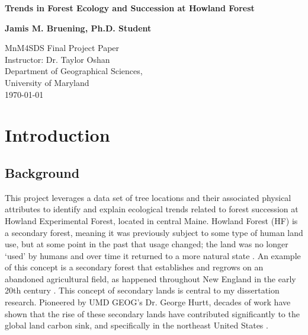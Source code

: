 \documentclass[12pt,a4paper]{article}
\begin{document}
\begin{titlepage}
\begin{center}
\vspace*{7cm}
\begin{LARGE}
\textbf{Trends in Forest Ecology and Succession at Howland Forest}
\end{LARGE}

\vspace{6.5cm}

\begin{Large}
\textbf{Jamis M. Bruening, Ph.D. Student}\\
\end{Large}

\vspace*{0.5cm}


MnM4SDS Final Project Paper \\
Instructor: Dr. Taylor Oshan \\
Department of Geographical Sciences, \\
University of Maryland \\
\vspace*{.5cm}
\today 


\vspace*{5cm}

\end{center}
\end{titlepage}
\newpage

\setcounter{tocdepth}{2}
\tableofcontents
\newpage

\doublespacing

\section{Introduction}

\subsection{Background}

This project leverages a data set of tree locations and their associated physical attributes to identify and explain ecological trends related to forest succession at Howland Experimental Forest, located in central Maine.  Howland Forest (HF) is a secondary forest, meaning it was previously subject to some type of human land use, but at some point in the past that usage changed; the land was no longer `used' by humans and over time it returned to a more natural state \citep{hurtt2011}.  An example of this concept is a secondary forest that establishes and regrows on an abandoned agricultural field, as happened throughout New England in the early 20th century \cite{foster1998,canadell2007saturation}. This concept of secondary lands is central to my dissertation research.  Pioneered by UMD GEOG's Dr. George Hurtt, decades of work have shown that the rise of these secondary lands have contributed significantly to the global land carbon sink, and specifically in the northeast United States \citep{hurtt2002,hurtt2006,albani2006,houghton2012,houghton2017}.  
\end{document}
